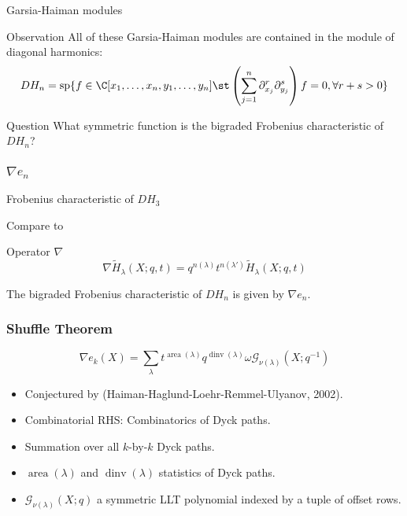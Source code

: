 \documentclass{beamer}
\renewcommand{\Span}{\operatorname{sp}}
\DeclareMathOperator{\area}{area}
\DeclareMathOperator{\dinv}{dinv}
\newcommand{\Gcal}{\mathcal{G}}
\newcounter{c}
\begin{document}
  \begin{frame}{Garsia-Haiman modules}
  \begin{block}{Observation}
    All of these Garsia-Haiman modules are contained in the module of
    diagonal harmonics:  \[
      DH_n = \Span\{ f \in \C[x_1,\ldots,x_n,y_1,\ldots,y_n] \st
      \left(\sum_{j=1}^n \partial_{x_j}^r \partial_{y_j}^s\right) f = 0, \forall r+s>0\}
    \]
  \end{block}\pause
  \begin{block}{Question}
    What symmetric function is the bigraded Frobenius characteristic
    of \(DH_n\)?
  \end{block}
\end{frame}
\begin{frame}
  \frametitle{\(\nabla e_n\)}
  Frobenius characteristic of \(DH_3\)\pause
  \begin{center}
    \pause
\end{center}
Compare to
\begin{center}
  \end{center}\pause
  \begin{block}{Operator \(\nabla\)}
    \[
      \nabla \tilde{H}_\lambda(X;q,t) = q^{n(\lambda)} t^{n(\lambda')} \tilde{H}_\lambda(X;q,t)
    \]
  \end{block}\pause
  \begin{theorem}[Haiman, 2002]
    The bigraded Frobenius characteristic of \(DH_n\) is given by \(\nabla e_n\).
  \end{theorem}
\end{frame}
\begin{frame}
  \frametitle{Shuffle Theorem}
  \begin{theorem}
    \[
      \nabla e_k(X) = \sum_\lambda t^{\area(\lambda)}q^{\dinv(\lambda)}
      \omega \Gcal_{\nu(\lambda)}(X;q^{-1})
    \]
  \end{theorem}
  \begin{itemize}
  \item Conjectured by (Haiman-Haglund-Loehr-Remmel-Ulyanov, 2002).\pause
  \item Combinatorial RHS: Combinatorics of Dyck paths. \pause
  \item Summation over all \(k\)-by-\(k\) Dyck paths.\pause
  \item \(\area(\lambda)\) and \(\dinv(\lambda)\) statistics of Dyck paths.\pause
  \item \(\Gcal_{\nu(\lambda)}(X;q)\) a symmetric LLT polynomial
    indexed by a tuple of offset rows.
  \end{itemize}
\end{frame}
\end{document}
